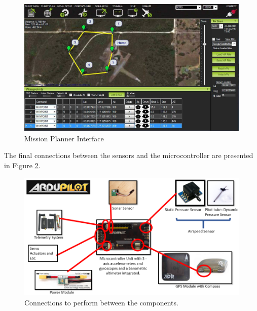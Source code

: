\documentclass[english,fira]{ist-report}
\begin{document}
\begin{figure}[ht]
    \centering
    \includegraphics[width=\textwidth]{graphics/AVIONICS/ardupilot5.jpg}
    \caption{Mission Planner Interface}
    \label{fig:ardupilotplannerinterface}
\end{figure}

\newpage
\vspace{1cm}
The final connections between the sensors and the microcontroller are presented in Figure \ref{fig:ardupilotconnections}.
\vspace{1cm}
\begin{figure}[ht]
    \centering
    \includegraphics[width=\textwidth]{graphics/AVIONICS/ardupilot6.png}
    \caption{Connections to perform between the components.}
    \label{fig:ardupilotconnections}
\end{figure}


\newpage
\end{document}
